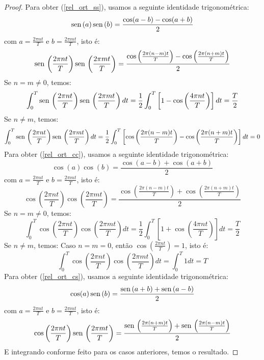 \begin{proof}
 Para obter (\ref{rel_ort_ss}), usamos a seguinte identidade trigonométrica:
 \begin{equation}\operatorname{sen}\,(a)\operatorname{sen}\,(b)=\frac{\cos(a-b)-\cos(a+b)}{2}\end{equation}
com $a=\frac{2\pi nt}{T}$ e $b=\frac{2\pi mt}{T}$, isto é:
 \begin{equation}\operatorname{sen}\,\left(\frac{2\pi nt}{T}\right)\operatorname{sen}\,\left(\frac{2\pi mt}{T}\right)=\frac{\cos\left(\frac{2\pi (n-m)t}{T}\right)-\cos\left(\frac{2\pi (n+m)t}{T}\right)}{2}\end{equation}
Se $n=m\neq 0$, temos:
 \begin{equation}\int_0^T\operatorname{sen}\,\left(\frac{2\pi nt}{T}\right)\operatorname{sen}\,\left(\frac{2\pi mt}{T}\right)dt=\frac{1}{2}\int_0^T\left[1-\cos\left(\frac{4\pi nt}{T}\right)\right]dt=\frac{T}{2}\end{equation}
 Se $n\neq m$, temos:
 \begin{equation}\int_0^T\operatorname{sen}\,\left(\frac{2\pi nt}{T}\right)\operatorname{sen}\,\left(\frac{2\pi mt}{T}\right)dt=\frac{1}{2}\int_0^T\left[\cos\left(\frac{2\pi (n-m)t}{T}\right)-\cos\left(\frac{2\pi (n+m)t}{T}\right)\right]dt=0\end{equation}
 Para obter (\ref{rel_ort_cc}), usamos a seguinte identidade trigonométrica:
 \begin{equation}\cos(a)\cos(b)=\frac{\cos(a-b)+\cos(a+b)}{2}\end{equation}
com $a=\frac{2\pi nt}{T}$ e $b=\frac{2\pi mt}{T}$, isto é:
 \begin{equation}\cos\left(\frac{2\pi nt}{T}\right)\cos\left(\frac{2\pi mt}{T}\right)=\frac{\cos\left(\frac{2\pi (n-m)t}{T}\right)+\cos\left(\frac{2\pi (n+m)t}{T}\right)}{2}\end{equation}
 Se $n=m\neq 0$, temos:
 \begin{equation}\int_0^T\cos\left(\frac{2\pi nt}{T}\right)\cos\left(\frac{2\pi mt}{T}\right)dt=\frac{1}{2}\int_0^T\left[1+\cos\left(\frac{4\pi nt}{T}\right)\right]dt=\frac{T}{2}\end{equation}
 Se $n\neq m$, temos:
Caso $n=m= 0$, então $\cos\left(\frac{2\pi nt}{T}\right)=1$, isto é:
\begin{equation}\int_0^T\cos\left(\frac{2\pi nt}{T}\right)\cos\left(\frac{2\pi mt}{T}\right)dt=\int_0^T 1dt=T\end{equation}
 Para obter (\ref{rel_ort_cs}), usamos a seguinte identidade trigonométrica:
\begin{equation}\cos(a)\operatorname{sen}\,(b)=\frac{\operatorname{sen}\,(a+b)+\operatorname{sen}\,(a-b)}{2}\end{equation} 
com $a=\frac{2\pi nt}{T}$ e $b=\frac{2\pi mt}{T}$, isto é:
 \begin{equation}\cos\left(\frac{2\pi nt}{T}\right)\operatorname{sen}\,\left(\frac{2\pi mt}{T}\right)=\frac{\operatorname{sen}\,\left(\frac{2\pi (n+m)t}{T}\right)+\operatorname{sen}\,\left(\frac{2\pi (n-m)t}{T}\right)}{2}\end{equation}
E integrando conforme feito para os casos anteriores, temos o resultado.
 \end{proof}

